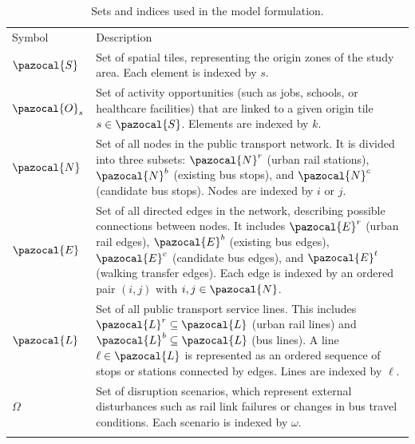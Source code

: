 \documentclass[3p,times,procedia]{elsarticle}
\begin{document}
\begin{table}[h]
\caption{Sets and indices used in the model formulation.}
\begin{tabularx}{\hsize}{@{\extracolsep{\fill}}lX@{}}
\toprule
Symbol & Description \\
\colrule
$\pazocal{S}$ & Set of spatial tiles, representing the origin zones of the study area. Each element is indexed by $s$. \\

$\pazocal{O}_s$ & Set of activity opportunities (such as jobs, schools, or healthcare facilities) that are linked to a given origin tile $s \in \pazocal{S}$. Elements are indexed by $k$. \\

$\pazocal{N}$ & Set of all nodes in the public transport network. It is divided into three subsets: $\pazocal{N}^r$ (urban rail stations), $\pazocal{N}^b$ (existing bus stops), and $\pazocal{N}^c$ (candidate bus stops). Nodes are indexed by $i$ or $j$. \\

$\pazocal{E}$ & Set of all directed edges in the network, describing possible connections between nodes. It includes $\pazocal{E}^r$ (urban rail edges), $\pazocal{E}^b$ (existing bus edges), $\pazocal{E}^c$ (candidate bus edges), and $\pazocal{E}^t$ (walking transfer edges). Each edge is indexed by an ordered pair $(i,j)$ with $i,j \in \pazocal{N}$. \\

$\pazocal{L}$ & Set of all public transport service lines. This includes $\pazocal{L}^r \subseteq \pazocal{L}$ (urban rail lines) and $\pazocal{L}^b \subseteq \pazocal{L}$ (bus lines). A line $\ell \in \pazocal{L}$ is represented as an ordered sequence of stops or stations connected by edges. Lines are indexed by $\ell$. \\

$\Omega$ & Set of disruption scenarios, which represent external disturbances such as rail link failures or changes in bus travel conditions. Each scenario is indexed by $\omega$. \\
\botrule
\end{tabularx}
\end{table}
\end{document}
